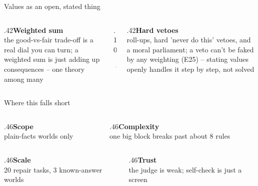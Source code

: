 \documentclass[aspectratio=169,11pt]{beamer}
\begin{document}
\begin{frame}{Values as an open, stated thing}\vfill\begin{columns}[c]\begin{column}{.42\textwidth}{\color{owdeep}\large\bfseries Weighted sum}\\[3pt]{\color{owmuted}the good-vs-fair trade-off is a real dial you can turn; a weighted sum is just adding up consequences -- one theory among many}\end{column}\begin{column}{.10\textwidth}\begin{center}{\color{owochre}\Huge$\rightarrow$}\end{center}\end{column}\begin{column}{.42\textwidth}{\color{owdeep}\large\bfseries Hard vetoes}\\[3pt]{\color{owmuted}roll-ups, hard 'never do this' vetoes, and a moral parliament; a veto can't be faked by any weighting (E25) -- stating values openly handles it step by step, not solved}\end{column}\end{columns}\vfill\end{frame}
\begin{frame}{Where this falls short}\vfill\begin{columns}[T]\begin{column}{.46\textwidth}{\color{owdeep}\bfseries Scope}\\[2pt]{\color{owmuted}\small plain-facts worlds only}\end{column}\begin{column}{.46\textwidth}{\color{owdeep}\bfseries Complexity}\\[2pt]{\color{owmuted}\small one big block breaks past about 8 rules}\end{column}\end{columns}\vskip12pt\begin{columns}[T]\begin{column}{.46\textwidth}{\color{owdeep}\bfseries Scale}\\[2pt]{\color{owmuted}\small 20 repair tasks, 3 known-answer worlds}\end{column}\begin{column}{.46\textwidth}{\color{owdeep}\bfseries Trust}\\[2pt]{\color{owmuted}\small the judge is weak; self-check is just a screen}\end{column}\end{columns}\vfill\end{frame}
\end{document}
